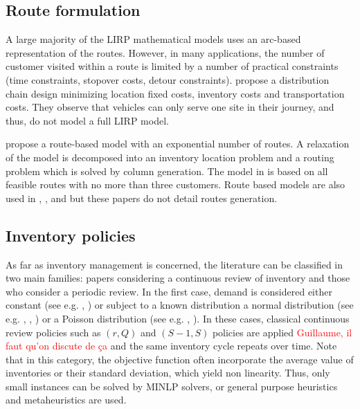 \documentclass[a4paper,10pt]{article}
\begin{document}
\begin{linenumbers}
\subsection{Route formulation}
\label{sec:r}

A large majority of the LIRP mathematical models uses an arc-based representation of the routes. 
However, in many applications, the number of customer visited within a route is limited by a number of practical constraints (time constraints, stopover costs, detour constraints). \cite{MaDav05} propose a distribution chain design  minimizing location fixed costs, inventory costs and transportation costs. They observe that vehicles can only serve one site in their journey, and thus, do not model a full LIRP model. 

\cite{Guerrero2013} propose a route-based model with an exponential number of routes. A relaxation of the model is decomposed into an inventory location problem and a routing problem which is solved by column generation. 
The model in \cite{Lehrlaly2016} is based on all feasible routes with no more than three customers. 
Route based models are also used in \cite{LiGuoWangFu2013}, \cite{LiuChenLiLiu2015},  \cite{Deng2016} and \cite{hiassat_genetic_2017} 
but these papers do not detail routes generation.

\subsection{Inventory policies}
\label{sec:i}

As far as inventory management is concerned, the literature can be classified in two main families: papers considering a continuous review of inventory and those who consider a periodic review. 
In the first case, demand is considered either constant (see e.g. \cite{AhmSed2012}, \cite{Deng2016}) or subject to a known distribution a 
normal distribution (see e.g. \cite{Nekooghadirli2014}, \cite{Zhalechian2016}, \cite{Saragih2018}) or a Poisson distribution (see e.g. \cite{Asadi2018}, \cite{HabibiAS2018}). In these cases, classical continuous review policies such as $(r,Q)$ and $(S-1,S)$ policies are applied \textcolor{red}{Guillaume, il faut qu'on discute de ça} and the same inventory cycle repeats over time. Note that in this category, the objective function often incorporate the average value of inventories or their standard deviation, which yield non linearity. Thus, only small instances can be solved by MINLP solvers, or general purpose heuristics and metaheuristics are used. 



\end{linenumbers}
\end{document}
